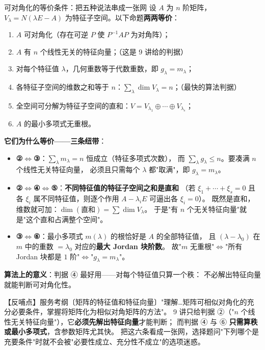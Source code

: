 \begin{fdeep}{可对角化的等价条件：把五种说法串成一张网}
设 $A$ 为 $n$ 阶矩阵，$V_{\lambda}=N(\lambda E-A)$ 为特征子空间。以下命题\textbf{两两等价}：
\begin{enumerate}[leftmargin=2.2em,itemsep=0.22em]
\item $A$ 可对角化（存在可逆 $P$ 使 $P^{-1}AP$ 为对角阵）；
\item $A$ 有 $n$ 个线性无关的特征向量；（这是 9 讲给的判据）
\item 对每个特征值 $\lambda$，几何重数等于代数重数，即 $g_{\lambda}=m_{\lambda}$；
\item 各特征子空间的维数之和等于 $n$：$\sum_{\lambda}\dim V_{\lambda}=n$；（最快的算法判据）
\item 全空间可分解为特征子空间的直和：$V=V_{\lambda_1}\oplus\cdots\oplus V_{\lambda_s}$；
\item $A$ 的最小多项式无重根。
\end{enumerate}

\textbf{它们为什么等价——三条纽带}：
\begin{itemize}[leftmargin=2.2em,itemsep=0.25em]
\item \textbf{②$\iff$③}：$\sum_{\lambda}m_{\lambda}=n$ 恒成立（特征多项式次数），
      而 $\sum_{\lambda}g_{\lambda}\le n$。要凑满 $n$ 个线性无关特征向量，
      必须且只需每个 $\lambda$ 都"取满"，即 $g_{\lambda}=m_{\lambda}$。
\item \textbf{②$\iff$④$\iff$⑤}：\textbf{不同特征值的特征子空间之和是直和}
      （若 $\xi_1+\cdots+\xi_s=0$ 且各 $\xi_i$ 属不同特征值，则逐个作用 $A-\lambda_i E$ 可逼出各 $\xi_i=0$）。
      既然是直和，维数就可加：$\dim(\text{直和})=\sum\dim V_{\lambda}$。
      于是"有 $n$ 个无关特征向量"就是"这个直和占满整个空间"。
\item \textbf{③$\iff$⑥}：最小多项式 $m(\lambda)$ 的根恰好是 $A$ 的全部特征值，
      且 $(\lambda-\lambda_0)$ 在 $m$ 中的重数 $=\lambda_0$ 对应的\textbf{最大 Jordan 块阶数}。
      故"$m$ 无重根"$\iff$"所有 Jordan 块都是 $1$ 阶"$\iff$"$g_{\lambda}=m_{\lambda}$"。
\end{itemize}

\textbf{算法上的意义}：判据 ④ 最好用——对每个特征值只算一个秩：
不必解出特征向量就能判断可对角化性。

【反哺点】服务考纲〔矩阵的特征值和特征向量〕"理解…矩阵可相似对角化的充分必要条件，掌握将矩阵化为相似对角矩阵的方法"。
9 讲只给判据 ②（"$n$ 个线性无关特征向量"），它\textbf{必须先解出特征向量}才能判断；
而判据 ④ 与 ⑥ \textbf{只需算秩或最小多项式}，含参数矩阵尤其快。
把这六条看成一张网，选择题问"下列哪个是充要条件"时就不会被"必要性成立、充分性不成立"的选项迷惑。
\end{fdeep}

